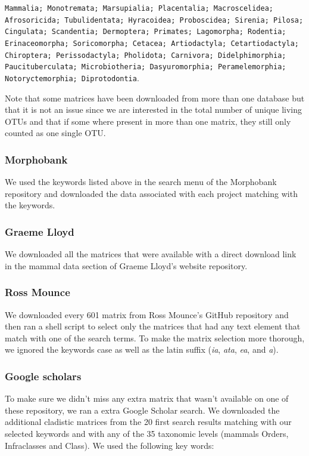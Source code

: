 \texttt{Mammalia; Monotremata; Marsupialia; Placentalia; Macroscelidea;\\
        Afrosoricida; Tubulidentata; Hyracoidea; Proboscidea; Sirenia; Pilosa;\\
        Cingulata; Scandentia; Dermoptera; Primates; Lagomorpha; Rodentia;\\
        Erinaceomorpha; Soricomorpha; Cetacea; Artiodactyla; Cetartiodactyla;\\
        Chiroptera; Perissodactyla; Pholidota; Carnivora; Didelphimorphia;\\
        Paucituberculata; Microbiotheria; Dasyuromorphia; Peramelemorphia;\\
        Notoryctemorphia; Diprotodontia}.

Note that some matrices have been downloaded from more than one database but that it is not an issue since we are interested in the total number of unique living OTUs and that if some where present in more than one matrix, they still only counted as one single OTU.

\subsubsection*{Morphobank}
We used the keywords listed above in the search menu of the Morphobank repository and downloaded the data associated with each project matching with the keywords.

\subsubsection*{Graeme Lloyd}
We downloaded all the matrices that were available with a direct download link in the mammal data section of Graeme Lloyd's website repository.

\subsubsection*{Ross Mounce}
We downloaded every 601 matrix from Ross Mounce's GitHub repository and then ran a shell script to select only the matrices that had any text element that match with one of the search terms.
To make the matrix selection more thorough, we ignored the keywords case as well as the latin suffix (\textit{ia}, \textit{ata}, \textit{ea}, and \textit{a}).

\subsubsection*{Google scholars}
To make sure we didn't miss any extra matrix that wasn't available on one of these repository, we ran a extra Google Scholar search. 
We downloaded the additional cladistic matrices from the 20 first search results matching with our selected keywords and with any of the 35 taxonomic levels (mammals Orders, Infraclasses and Class).
We used the following key words:

